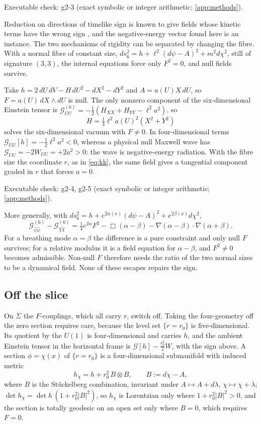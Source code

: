\noindent Executable check: g2-3 (exact symbolic or integer arithmetic; \cref{app:methods}).

Reduction on directions of timelike sign is known to give fields whose kinetic terms have the wrong sign \cite{Hull98}, and the negative-energy vector
found here is an instance. The two mechanisms of rigidity can be separated by changing the fibre. With a normal fibre of constant size,
$ds_6^2=h+\ell^2(d\psi-A)^2+m^2d\chi^2$, still of signature $(3,3)$, the internal equations force only $F^2=0$, and null fields survive.

\begin{example}
\label{ex:nullwave}
Take $h=2\,dU\,dV-H\,dU^2-dX^2-dY^2$ and $A=a(U)X\,dU$, so $F=a(U)\,dX\wedge dU$ is null. The only nonzero component of the six-dimensional Einstein tensor is
$\mathcal G^{(6)}_{UU}=-\tfrac12(H_{XX}+H_{YY}-\ell^2a^2)$, so
\[
H=\tfrac14\ell^2a(U)^2(X^2+Y^2)
\]
solves the six-dimensional vacuum with $F\neq0$. In four-dimensional terms $\mathcal G_{UU}[h]=-\tfrac12\ell^2a^2<0$, whereas a physical null Maxwell wave has
$\mathcal G_{UU}=-2W_{UU}=+2a^2>0$: the wave is negative-energy radiation. With the fibre size the coordinate $r$, as in \eqref{eq:kk}, the same field gives a
tangential component graded in $r$ that forces $a=0$.
\end{example}

\noindent Executable check: g2-4, g2-5 (exact symbolic or integer arithmetic; \cref{app:methods}).

More generally, with $ds_6^2=h+e^{2\alpha(x)}(d\psi-A)^2+e^{2\beta(x)}d\chi^2$,
\[
\mathcal G^{(6)}_{\hat\psi\hat\psi}-\mathcal G^{(6)}_{\hat\chi\hat\chi}=\tfrac14e^{2\alpha}F^2-\Box(\alpha-\beta)-\nabla(\alpha-\beta)\cdot\nabla(\alpha+\beta).
\]
For a breathing mode $\alpha=\beta$ the difference is a pure constraint and only null $F$ survives; for a relative modulus it is a field equation for $\alpha-\beta$,
and $F^2\neq0$ becomes admissible. Non-null $F$ therefore needs the ratio of the two normal sizes to be a dynamical field. None of these escapes repairs
the sign.

\subsection{Off the slice}

On $\Sigma$ the $F$-couplings, which all carry $r$, switch off. Taking the four-geometry off the zero section requires care, because the level set
$\{r=r_0\}$ is five-dimensional. Its quotient by the $U(1)$ is four-dimensional and carries $h$, and the ambient Einstein tensor in the horizontal frame is
$\mathcal G[h]-\tfrac{r_0^2}2W$, with the sign above. A section $\phi=\chi(x)$ of $\{r=r_0\}$ is a four-dimensional submanifold with induced metric
\[
h_\chi=h+r_0^2\,B\otimes B,\qquad B:=d\chi-A ,
\]
where $B$ is the St\"uckelberg combination, invariant under $A\mapsto A+d\lambda$, $\chi\mapsto\chi+\lambda$; $\det h_\chi=\det h\,(1+r_0^2|B|^2)$, so $h_\chi$ is Lorentzian
only where $1+r_0^2|B|^2>0$, and the section is totally geodesic on an open set only where $B=0$, which requires $F=0$.

